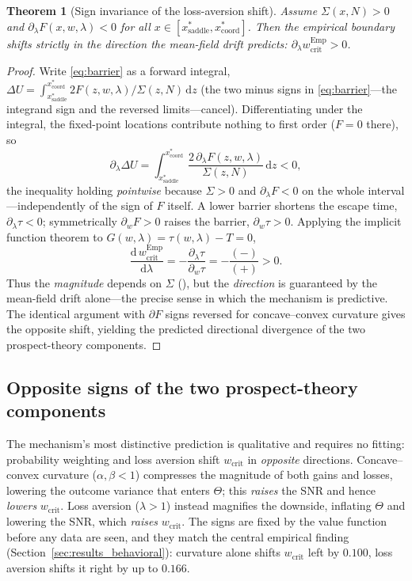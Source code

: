 \documentclass[letterpaper]{article}
\theoremstyle{plain}
\newtheorem{theorem}{Theorem}
\newcommand{\wcrit}{w_{\mathrm{crit}}}
\begin{document}
\begin{theorem}[Sign invariance of the loss-aversion shift]\label{thm:sign}
Assume $\Sigma(x,N)>0$ and $\partial_\lambda F(x,w,\lambda)<0$ for all
$x\in[x^\ast_{\mathrm{saddle}},x^\ast_{\mathrm{coord}}]$. Then the empirical
boundary shifts strictly in the direction the mean-field drift predicts:
$\partial_\lambda w_{\mathrm{crit}}^{\mathrm{Emp}}>0$.
\end{theorem}
\begin{proof}
Write \eqref{eq:barrier} as a forward integral,
$\Delta U=\int_{x^\ast_{\mathrm{saddle}}}^{x^\ast_{\mathrm{coord}}}
2F(z,w,\lambda)/\Sigma(z,N)\,\mathrm{d}z$ (the two minus signs in
\eqref{eq:barrier}---the integrand sign and the reversed limits---cancel).
Differentiating under the integral, the fixed-point locations contribute nothing
to first order ($F=0$ there), so
\begin{equation}
  \partial_\lambda \Delta U
  = \int_{x^\ast_{\mathrm{saddle}}}^{x^\ast_{\mathrm{coord}}}
      \frac{2\,\partial_\lambda F(z,w,\lambda)}{\Sigma(z,N)}\,\mathrm{d}z < 0,
  \nonumber
\end{equation}
the inequality holding \emph{pointwise} because $\Sigma>0$ and
$\partial_\lambda F<0$ on the whole interval---independently of the sign of $F$
itself. A lower barrier shortens the escape time, $\partial_\lambda\tau<0$;
symmetrically $\partial_w F>0$ raises the barrier, $\partial_w\tau>0$. Applying
the implicit function theorem to $G(w,\lambda)=\tau(w,\lambda)-T=0$,
\begin{equation}
  \frac{\mathrm{d}\,w_{\mathrm{crit}}^{\mathrm{Emp}}}{\mathrm{d}\lambda}
  = -\frac{\partial_\lambda\tau}{\partial_w\tau}
  = -\frac{(-)}{(+)} > 0 .
  \nonumber
\end{equation}
Thus the \emph{magnitude} depends on $\Sigma$ (), but the
\emph{direction} is guaranteed by the mean-field drift alone---the precise sense
in which the mechanism is predictive. The identical argument with $\partial F$
signs reversed for concave--convex curvature gives the opposite shift, yielding
the predicted directional divergence of the two prospect-theory components.
\end{proof}

\subsection{Opposite signs of the two prospect-theory components}
The mechanism's most distinctive prediction is qualitative and requires no
fitting: probability weighting and loss aversion shift $\wcrit$ in
\emph{opposite} directions. Concave--convex curvature ($\alpha,\beta<1$)
compresses the magnitude of both gains and losses, lowering the outcome
variance that enters $\Theta$; this \emph{raises} the SNR and hence
\emph{lowers} $\wcrit$. Loss aversion ($\lambda>1$) instead magnifies the
downside, inflating $\Theta$ and lowering the SNR, which \emph{raises}
$\wcrit$. The signs are fixed by the value function before any data are
seen, and they match the central empirical finding
(Section~\ref{sec:results_behavioral}): curvature alone shifts $\wcrit$ left by
$0.100$, loss aversion shifts it right by up to $0.166$.
\end{document}
